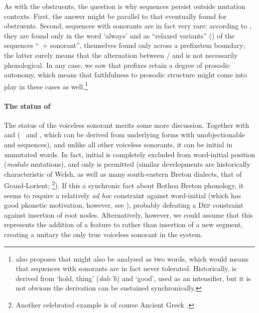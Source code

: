 As with the obstruents, the question is why \ipa{[h.C]} sequences persist outside mutation contexts. First, the answer might be parallel to that eventually found for obstruents. Second, \ipa{[h.C]} sequences with sonorants are in fact very rare: according to \citet[p.~173]{humphreys95:_phonol_bothoa_saint_nicol_pelem}, they are found only in the word \ipa{[dæhˈmaːd̥]} `always' and as \enquote{relaxed variants} () of the sequences \enquote{\ipa{[s]}~+ sonorant}, themselves found only across a prefix\endash stem boundary; the latter surely means that the alternation between \ipa{[z]}/\ipa{[s]} and \ipa{[h]} is not necessarily phonological. In any case, we saw that prefixes retain a degree of prosodic autonomy, which means that faithfulness to prosodic structure might come into play in these cases as well.\footnote{\citet{humphreys95:_phonol_bothoa_saint_nicol_pelem} also proposes that \ipa{[dæhˈmaːd̥]} might also be analysed as two words, which would means that \ipa{[h.C]} sequences with sonorants are in fact never tolerated. Historically, \ipa{[dæhˈmaːd̥]} is derived from \ipa{[ˈdæh]} `hold, thing' (\emph{dalc'h}) and \ipa{[ˈmaːd̥]} `good', used as an intensifier, but it is not obvious the derivation can be sustained synchronically.}

\paragraph{The status of \ipa{[hr]}}
\label{sec:status-hr}

The status of the voiceless sonorant \ipa{[r̥]} merits some more discussion. Together with \ipa{[ç]} and \ipa{[w̥\kern1pt]} (\ie\ \ipa{[hj]} and \ipa{[hw]}, which can be derived from underlying forms with unobjectionable  and  sequences), and unlike all other voiceless sonorants, it can be initial in unmutated words. In fact, initial \ipa{[r]} is completely excluded from word-initial position (\emph{modulo} mutations), and only \ipa{[r̥]} is permitted (similar developments are historically characteristic of Welsh, as well as many south-eastern Breton dialects, \eg that of Grand-Lorient; \citealt{cheveau07:_approc_grand_lorien}\footnote{Another celebrated example is of course Ancient Greek \citep{allen87:_vox_graec}.}). If this a synchronic fact about Bothoa Breton phonology, it seems to require a relatively \emph{ad hoc} constraint against word-initial \ipa{[r]} (which has good phonetic motivation, however, see \citealt{sole-trills}), probably defeating a \textsc{Dep} constraint against insertion of root nodes. Alternatively, however, we could assume that this represents the addition of a  feature to \ipa{[r]} rather than insertion of a new segment, creating a unitary \ipa{[r̥]} \dash the only true voiceless sonorant in the system.

